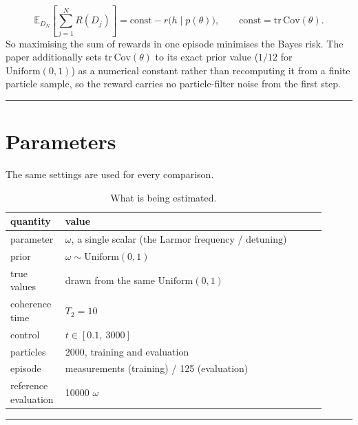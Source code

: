 \documentclass[12pt,a4paper]{article}
\begin{document}
\begin{equation}
\mathbb{E}_{D_N}\left[\sum_{j=1}^{N} R(D_j)\right] = \mathrm{const} - r\bigl(h \mid p(\theta)\bigr),
\qquad \mathrm{const} = \mathrm{tr}\,\mathrm{Cov}(\theta).
\label{eq:telescope}
\end{equation}
So maximising the sum of rewards in one episode minimises the Bayes risk. The paper additionally sets $\mathrm{tr}\,\mathrm{Cov}(\theta)$ to
its exact prior value ($1/12$ for $\mathrm{Uniform}(0,1)$) as a numerical constant rather than
recomputing it from a finite particle sample, so the reward carries no particle-filter noise from
the first step.

\noindent\rule{\textwidth}{0.4pt}
\FloatBarrier

\section{Parameters}
\label{sec:configuration}
The same settings are used for every comparison.

\begin{table}[H]
  \centering
  \caption{What is being estimated.}
  \label{tab:what-is-being-estimated}
  \footnotesize
  \begin{tabular}{%
    >{\raggedright\arraybackslash}p{0.124\linewidth}%
    >{\raggedright\arraybackslash}p{0.782\linewidth}}
  \toprule
  quantity & value \\
  \midrule
  parameter & $\omega$, a single scalar (the Larmor frequency / detuning) \\
  prior & $\omega \sim \mathrm{Uniform}(0, 1)$ \\
  true values & drawn from the same $\mathrm{Uniform}(0,1)$ \\
  coherence time & $T_2 = 10$ \\
  control & $t \in [0.1,\ 3000]$ \\
  particles & \num{2000}, training and evaluation \\
  episode & 100 measurements (training) / 125 (evaluation) \\
  reference evaluation & \num{10000} $\omega$ \\
  \bottomrule
  \end{tabular}
\end{table}

\noindent\rule{\textwidth}{0.4pt}
\FloatBarrier
\end{document}
